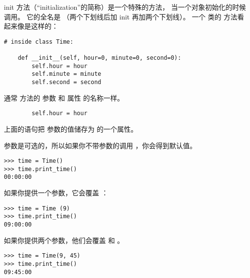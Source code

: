 init 方法（``initialization''的简称）是一个特殊的方法， 
当一个对象初始化的时候调用。  
它的全名是  （两个下划线后加 init 再加两个下划线）。
一个  类的  方法看起来像是这样的：

\begin{lstlisting}
# inside class Time:

    def __init__(self, hour=0, minute=0, second=0):
        self.hour = hour
        self.minute = minute
        self.second = second
\end{lstlisting}

%

通常  方法的 参数 和 属性 的名称一样。


\begin{lstlisting}
        self.hour = hour
\end{lstlisting}

%

上面的语句把  参数的值储存为  的一个属性。
  
  


参数是可选的，所以如果你不带参数的调用  ，你会得到默认值。

\begin{lstlisting}
>>> time = Time()
>>> time.print_time()
00:00:00
\end{lstlisting}

%

如果你提供一个参数，它会覆盖  ：

\begin{lstlisting}
>>> time = Time (9)
>>> time.print_time()
09:00:00
\end{lstlisting}

%

如果你提供两个参数，他们会覆盖  和  。

\begin{lstlisting}
>>> time = Time(9, 45)
>>> time.print_time()
09:45:00
\end{lstlisting}


